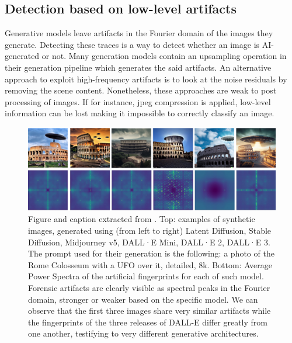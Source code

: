 \documentclass[12pt,a4paper]{article}
\begin{document}
\subsection{Detection based on low-level artifacts}
Generative models leave artifacts in the Fourier domain of the images they generate. Detecting these traces is a way to detect whether an image is AI-generated or not. Many generation models contain an upsampling operation in their generation pipeline which generates the said artifacts. An alternative approach to exploit high-frequency artifacts is to look at the noise residuals by removing the scene content. Nonetheless, these approaches are weak to post processing of images. If for instance, jpeg compression is applied, low-level information can be lost making it impossible to correctly classify an image.
\begin{figure}[H]
    \includegraphics[width=\textwidth]{img/peaks.png}
    \caption{Figure and caption extracted from \autocite*{tariangSyntheticImageVerification2024}. Top: examples of synthetic images, generated using (from left to right) Latent Diffusion, Stable Diffusion, Midjourney v5, DALL·E Mini, DALL·E 2, DALL·E 3. The prompt used for their generation is the following: a photo of the Rome Colosseum with a UFO over it, detailed, 8k. Bottom: Average Power Spectra of the artificial fingerprints for each of such model. Forensic artifacts are clearly visible as spectral peaks in the Fourier domain, stronger or weaker based on the specific model. We can observe that the first three images share very similar artifacts while the fingerprints of the three releases of DALL-E differ greatly from one another, testifying to very different generative architectures.}
\end{figure}
\end{document}
